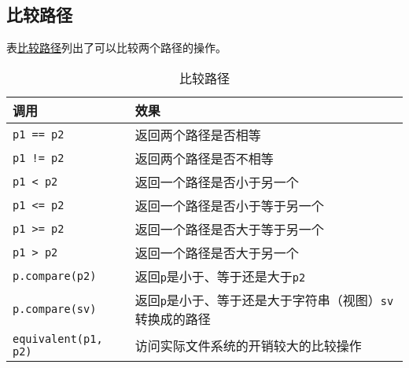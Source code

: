 \subsection{比较路径}\label{ch20.3.6}
表\hyperref[t20.8]{比较路径}列出了可以比较两个路径的操作。
\begin{table}[htb]
    \centering
    \begin{tabular}{l|l}
        \hline
        \textbf{调用}                 & \textbf{效果}                                    \\
        \hline
        \texttt{p1 == p2}           & 返回两个路径是否相等                                     \\
        \texttt{p1 != p2}           & 返回两个路径是否不相等                                    \\
        \texttt{p1 < p2}            & 返回一个路径是否小于另一个                                  \\
        \texttt{p1 <= p2}           & 返回一个路径是否小于等于另一个                                \\
        \texttt{p1 >= p2}           & 返回一个路径是否大于等于另一个                                \\
        \texttt{p1 > p2}            & 返回一个路径是否大于另一个                                  \\
        \texttt{p.compare(p2)}      & 返回\texttt{p}是小于、等于还是大于\texttt{p2}              \\
        \texttt{p.compare(sv)}      & 返回\texttt{p}是小于、等于还是大于字符串（视图）\texttt{sv}转换成的路径 \\
        \texttt{equivalent(p1, p2)} & 访问实际文件系统的开销较大的比较操作                             \\
        \hline
    \end{tabular}
    \caption{比较路径}
    \label{t20.8}
\end{table}

